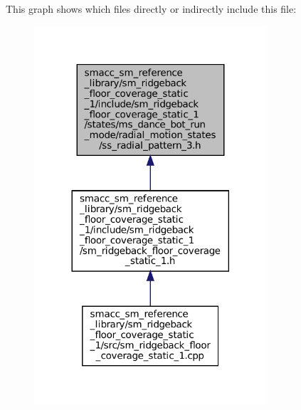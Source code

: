 This graph shows which files directly or indirectly include this file\+:
\nopagebreak
\begin{figure}[H]
\begin{center}
\leavevmode
\includegraphics[width=245pt]{sm__ridgeback__floor__coverage__static__1_2include_2sm__ridgeback__floor__coverage__static__1_2s36e5a46c2a5bb3464a10da66ff86899d}
\end{center}
\end{figure}
